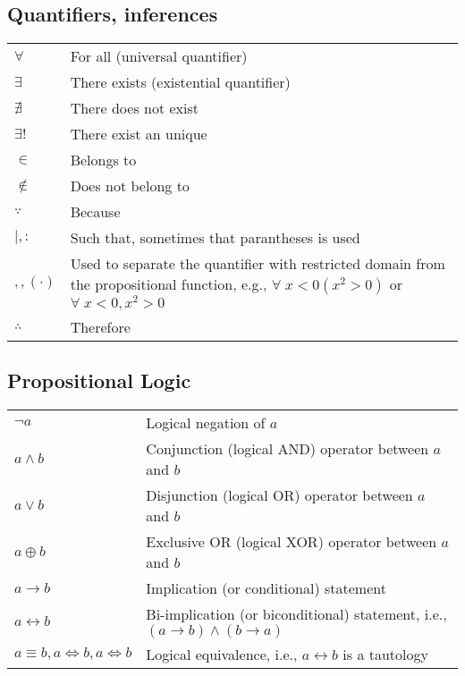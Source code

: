 \documentclass{article}
\begin{document}
\subsection{Quantifiers, inferences}
\begin{xltabular}{\textwidth}{XX}
    \(\forall\) & For all (universal quantifier) \cite{grahamConcreteMathematicsFoundation1989}\\
    \(\exists\) & There exists (existential quantifier) \cite{grahamConcreteMathematicsFoundation1989}\\
    \(\nexists\) & There does not exist \cite{grahamConcreteMathematicsFoundation1989}\\
    \(\exists!\) & There exist an unique \cite{grahamConcreteMathematicsFoundation1989}\\
    \(\in\) & Belongs to \cite{grahamConcreteMathematicsFoundation1989}\\
    \(\not\in\) & Does not belong to \cite{grahamConcreteMathematicsFoundation1989}\\
    \(\because\) & Because \cite{grahamConcreteMathematicsFoundation1989}\\
    \(\mid, :\) & Such that, sometimes that parantheses is used \cite{grahamConcreteMathematicsFoundation1989}\\
    \(, , \left( \cdot \right)\) & Used to separate the quantifier with restricted domain from the propositional function, e.g., \(\forall \; x < 0 \left( x^{2} > 0 \right)\) or \(\forall \; x < 0, x^{2} > 0\) \cite{grahamConcreteMathematicsFoundation1989}\\
    \(\therefore\) & Therefore \cite{grahamConcreteMathematicsFoundation1989}\\
\end{xltabular}

\subsection{Propositional Logic}
\begin{xltabular}{\textwidth}{XX}
    \(\lnot a\) & Logical negation of \(a\) \cite{rosenDiscreteMathematicsIts2011}\\
    \(a \wedge b\) & Conjunction (logical AND) operator between \(a\) and \(b\)\cite{rosenDiscreteMathematicsIts2011}\\
    \(a \vee b\) & Disjunction (logical OR) operator between \(a\) and \(b\)\cite{rosenDiscreteMathematicsIts2011}\\
    \(a \oplus b\) & Exclusive OR (logical XOR) operator between \(a\) and \(b\)\cite{rosenDiscreteMathematicsIts2011}\\
    \(a \rightarrow b\) & Implication (or conditional) statement\cite{rosenDiscreteMathematicsIts2011}\\
    \(a \leftrightarrow b\) & Bi-implication (or biconditional) statement, i.e., \(\left( a \rightarrow b \right) \wedge (b \rightarrow a )\) \cite{rosenDiscreteMathematicsIts2011}\\
    \(a \equiv b, a \iff b, a \Leftrightarrow b \) & Logical equivalence, i.e., \(a \leftrightarrow b\) is a tautology\cite{rosenDiscreteMathematicsIts2011}\\
\end{xltabular}
\end{document}
